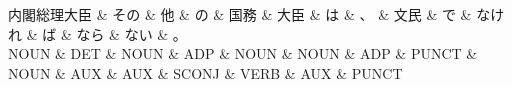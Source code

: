 \documentclass[tikz,border=5pt]{standalone}
\begin{document}
\normalsize
\begin{dependency}[edge unit distance=12.0pt]
    \begin{deptext}[column sep=1em]
        内閣総理大臣 \& その \& 他 \& の \& 国務 \& 大臣 \& は \& 、 \& 文民 \& で \& なけれ \& ば \& なら \& ない \& 。\\
        NOUN \& DET \& NOUN \& ADP \& NOUN \& NOUN \& ADP \& PUNCT \& NOUN \& AUX \& AUX \& SCONJ \& VERB \& AUX \& PUNCT\\
    \end{deptext}
\end{dependency}
\end{document}
